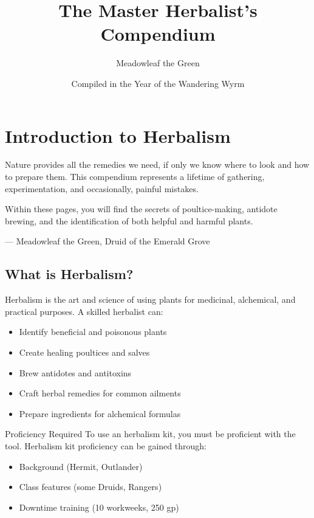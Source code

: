 \documentclass[letterpaper,twocolumn,openany]{dndbook}
\title{The Master Herbalist's Compendium}
\author{Meadowleaf the Green}
\date{Compiled in the Year of the Wandering Wyrm}
\begin{document}
\frontmatter

\maketitle

\tableofcontents

\mainmatter

\chapter{Introduction to Herbalism}

\begin{DndReadAloud}
    Nature provides all the remedies we need, if only we know where to look and how to prepare them. This compendium represents a lifetime of gathering, experimentation, and occasionally, painful mistakes.

    Within these pages, you will find the secrets of poultice-making, antidote brewing, and the identification of both helpful and harmful plants.

    \hfill — Meadowleaf the Green, Druid of the Emerald Grove
\end{DndReadAloud}

\section{What is Herbalism?}

Herbalism is the art and science of using plants for medicinal, alchemical, and practical purposes. A skilled herbalist can:

\begin{itemize}
    \item Identify beneficial and poisonous plants
    \item Create healing poultices and salves
    \item Brew antidotes and antitoxins
    \item Craft herbal remedies for common ailments
    \item Prepare ingredients for alchemical formulas
\end{itemize}

\begin{DndComment}{Proficiency Required}
    To use an herbalism kit, you must be proficient with the tool. Herbalism kit proficiency can be gained through:
    \begin{itemize}
        \item Background (Hermit, Outlander)
        \item Class features (some Druids, Rangers)
        \item Downtime training (10 workweeks, 250 gp)
    \end{itemize}
\end{DndComment}
\end{document}
